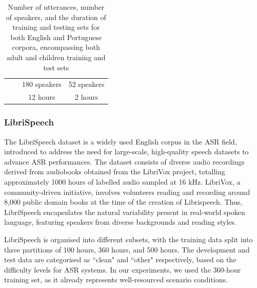 \begin{table}[h]
\begin{center}
\begin{tabular}{cccc}
                                &                                                                              & 180 speakers      & 52 speakers     \\
                                &                                                                              & 12 hours          & 2 hours         \\ \hline
    \end{tabular}
    \caption{Number of utterances, number of speakers, and the duration of training and testing sets for both English and Portuguese corpora, encompassing both adult and children training and test sets}
\label{tab:statistics_exp1}
\end{center}

    \end{table}


\subsubsection*{LibriSpeech}
The LibriSpeech dataset \cite{librispeech} is a widely used English corpus in the \ac{ASR} field, introduced to address the need for large-scale, high-quality speech datasets to advance \ac{ASR} performances. The dataset consists of diverse audio recordings derived from audiobooks obtained from the LibriVox project, totalling approximately 1000 hours of labelled audio sampled at 16 k\ac{Hz}. LibriVox, a community-driven initiative, involves volunteers reading and recording around 8,000 public domain books at the time of the creation of Librispeech. Thus, LibriSpeech encapsulates the natural variability present in real-world spoken language, featuring speakers from diverse backgrounds and reading styles.

LibriSpeech is organised into different subsets, with the training data split into three partitions of 100 hours, 360 hours, and 500 hours. The development and test data are categorised as ``clean" and ``other" respectively, based on the difficulty levels for \ac{ASR} systems. In our experiments, we used the 360-hour training set, as it already represents well-resourced scenario conditions.


